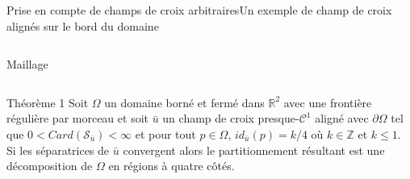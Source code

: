\documentclass[compress,10pt,aspectratio=169]{beamer}
\begin{document}
\begin{frame}{Prise en compte de champs de croix arbitraires}{Un exemple de champ de croix alignés sur le bord du domaine}
\begin{columns}
\begin{column}{0.33\textwidth}
        \footnotesize Maillage
        \end{column}
    \end{columns}
    \vspace{0.4cm}
        \begin{onerablock}{\small Théorème 1}
    \small
Soit $\Omega$ un domaine borné et fermé dans $\mathbb{R}^2$ avec une frontière régulière par morceau et soit $\bar{u}$ un champ de croix presque-$\mathcal{C}^1$ aligné avec $\partial\Omega$ tel que $0<Card(\mathcal{S}_{\bar{u}})<\infty$ et pour tout $p\in\Omega$, $id_{\bar{u}}(p)=k/4$ où $k\in\mathbb{Z}$ et $k\leq 1$. Si les séparatrices de $\bar{u}$ convergent alors le partitionnement résultant est une décomposition de $\Omega$ en régions à quatre côtés.
    \end{onerablock}
\end{frame}
\end{document}
